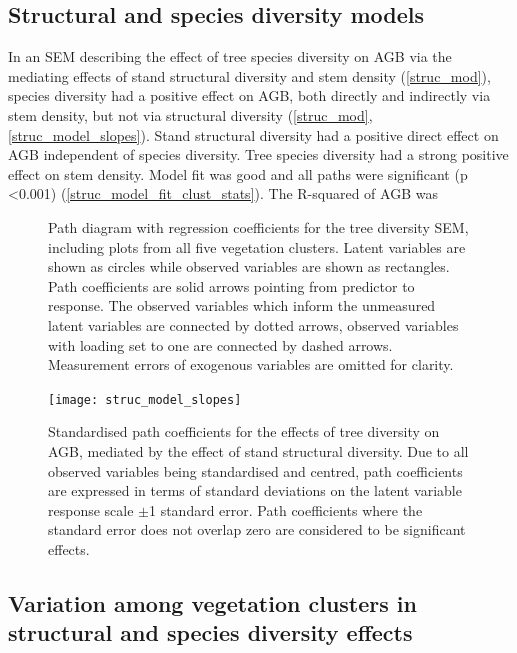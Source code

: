 \documentclass[11pt,a4paper]{article}
\begin{document}
\subsection{Structural and species diversity models}

In an SEM describing the effect of tree species diversity on AGB via the mediating effects of stand structural diversity and stem density (\autoref{struc_mod}), species diversity had a positive effect on AGB, both directly and indirectly via stem density, but not via structural diversity (\autoref{struc_mod}, \autoref{struc_model_slopes}). Stand structural diversity had a positive direct effect on AGB independent of species diversity. Tree species diversity had a strong positive effect on stem density. Model fit was good and all paths were significant (p <0.001) (\autoref{struc_model_fit_clust_stats}). The R-squared of AGB was \strucrsq{}


\begin{figure}[H]
\centering
	
	\caption{Path diagram with regression coefficients for the tree diversity SEM, including plots from all five vegetation clusters. Latent variables are shown as circles while observed variables are shown as rectangles. Path coefficients are solid arrows pointing from predictor to response. The observed variables which inform the unmeasured latent variables are connected by dotted arrows, observed variables with loading set to one are connected by dashed arrows. Measurement errors of exogenous variables are omitted for clarity.}
	\label{struc_mod}
\end{figure}

\begin{figure}[H]
\centering
	\texttt{[image: struc\_model\_slopes]}
	\caption{Standardised path coefficients for the effects of tree diversity on AGB, mediated by the effect of stand structural diversity. Due to all observed variables being standardised and centred, path coefficients are expressed in terms of standard deviations on the latent variable response scale $\pm$1 standard error. Path coefficients where the standard error does not overlap zero are considered to be significant effects.}
	\label{struc_model_slopes}
\end{figure}

\subsection{Variation among vegetation clusters in structural and species diversity effects}
\end{document}
